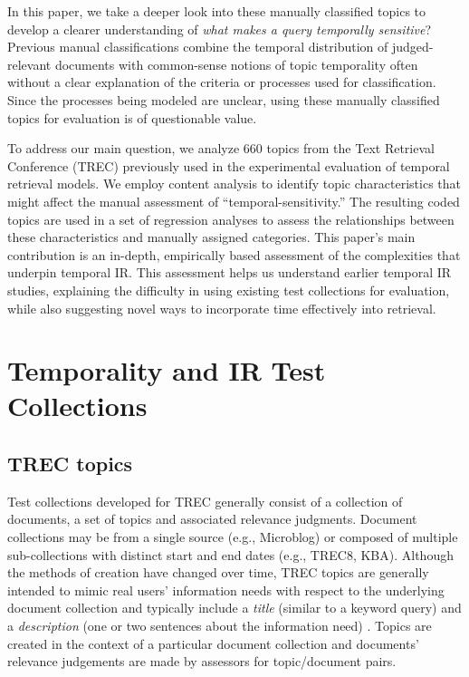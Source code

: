 \documentclass{sig-alternate}
\begin{document}
In this paper, we take a deeper look into these manually classified topics to develop a clearer understanding of \emph{what makes a query temporally sensitive}?  Previous manual classifications combine the temporal distribution of judged-relevant documents with common-sense notions of topic temporality often without a clear explanation of the criteria or processes used for classification. Since the processes being modeled are unclear, using these manually classified topics for evaluation is of questionable value. 

To address our main question, we analyze  660 topics from the Text Retrieval Conference (TREC) previously used in the experimental evaluation of temporal retrieval models. We employ content analysis to identify topic characteristics that might affect the manual assessment of ``temporal-sensitivity.'' The resulting coded topics are used in a set of regression analyses to assess the relationships between these characteristics and manually assigned categories.   This paper's main contribution is an in-depth, empirically based assessment of the complexities that underpin temporal IR.  This assessment helps us understand earlier temporal IR studies, explaining the difficulty in using existing test collections for evaluation, while also suggesting novel ways to incorporate time effectively into retrieval.

\section{Temporality and IR Test Collections}

\subsection{TREC topics}

Test collections developed for TREC generally consist of a collection of documents, a set of topics and associated relevance judgments. Document collections may be from a single source (e.g., Microblog) or composed of multiple sub-collections with distinct start and end dates (e.g., TREC8, KBA).  Although the methods of creation have changed over time, TREC topics are generally intended to mimic real users' information needs with respect to the underlying document collection and typically include a \textit{title} (similar to a keyword query) and a \textit{description} (one or two sentences about the information need) \cite{Voorhees2005}.   Topics are created in the context of a particular document collection and documents' relevance judgements are made by assessors for topic/document pairs.
\end{document}
